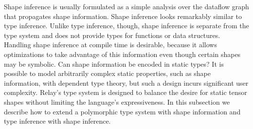   Shape inference is usually formulated as a simple analysis over the dataflow graph that
    propagates shape information.
  Shape inference looks remarkably similar to type inference.
  Unlike type inference, though, shape inference is separate from the type system and
    does not provide types for functions or data structures.
  Handling shape inference at compile time is desirable, because it allows optimizations to take
    advantage of this information even though certain shapes may be symbolic. Can shape information be encoded in static types?
  It is possible to model arbitrarily complex static properties, such
    as shape information, with dependent type theory, but such
    a design incurs significant user complexity.
  Relay's type system is designed to balance the desire for static tensor shapes
    without limiting the language's expressiveness.
  In this subsection we describe how to extend a polymorphic type system with shape
    information and type inference with shape inference.

